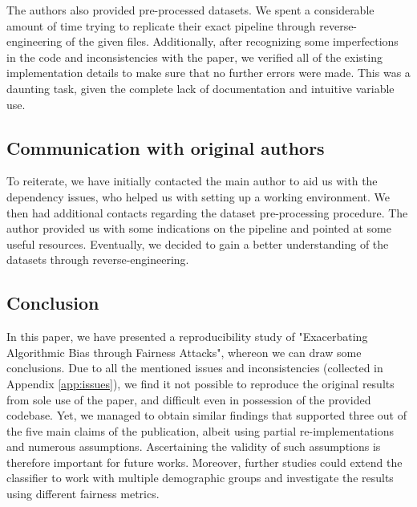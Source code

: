 The authors also provided pre-processed datasets. We spent a considerable amount of time trying to replicate their exact pipeline through reverse-engineering of the given files. Additionally, after recognizing some imperfections in the code and inconsistencies with the paper, we verified all of the existing implementation details to make sure that no further errors were made. This was a daunting task, given the complete lack of documentation and intuitive variable use.

\subsection{Communication with original authors}
To reiterate, we have initially contacted the main author to aid us with the dependency issues, who helped us with setting up a working environment. We then had additional contacts regarding the dataset pre-processing procedure. The author provided us with some indications on the pipeline and pointed at some useful resources. Eventually, we decided to gain a better understanding of the datasets through reverse-engineering.

\subsection{Conclusion}
In this paper, we have presented a reproducibility study of "Exacerbating Algorithmic Bias through Fairness Attacks", whereon we can draw some conclusions. Due to all the mentioned issues and inconsistencies (collected in Appendix \ref{app:issues}), we find it not possible to reproduce the original results from sole use of the paper, and difficult even in possession of the provided codebase. Yet, we managed to obtain similar findings that supported three out of the five main claims of the publication, albeit using partial re-implementations and numerous assumptions. Ascertaining the validity of such assumptions is therefore important for future works. Moreover, further studies could extend the classifier to work with multiple demographic groups and investigate the results using different fairness metrics.
